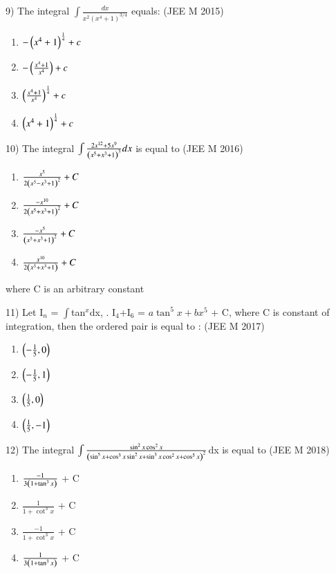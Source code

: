 \documentclass[journal,12pt,twocolumn]{IEEEtran}
\theoremstyle{remark}
\begin{document}
9)
	 The integral $\int\frac{dx}{x^2(x^4+1)^{3/4}}$ equals:
		\hfill{(JEE M 2015)}

		\begin{multicols}{2}
			\begin{enumerate}[label=(\alph*)]
				\item $-\left(x^4+1\right)^{\frac{1}{4}}+c$
				\item $-\left(\frac{x^4+1}{x^4}\right)+c$
				\item $\left(\frac{x^4+1}{x^4}\right)^{\frac{1}{4}}+c$
				\item $\left(x^4+1\right)^{\frac{1}{4}}+c$
			\end{enumerate}
		\end{multicols}

10)
	 The integral $\int\frac{2x^{12}+5x^9}{\left(x^5+x^3+1\right)^3}dx$ is equal to
		\hfill{(JEE M 2016)}

		\begin{multicols}{2}
			\begin{enumerate}[label=(\alph*)]
				\item $\frac{x^5}{2\left(x^5-x^3+1\right)^2}+C$
				\item $\frac{-x^{10}}{2\left(x^5+x^3+1\right)^2}+C$
				\item $\frac{-x^5}{\left(x^5+x^3+1\right)^2}+C$
				\item $\frac{x^{10}}{2\left(x^5+x^3+1\right)}+C$
			\end{enumerate}
		\end{multicols}
		where C is an arbitrary constant

11)
	 Let I$_n$ = $\int$tan$^x$dx, . I$_4$+I$_6$ = $a \tan^5x + bx^5$ + C, where C is constant of integration, then the ordered pair  is equal to :
		\hfill{(JEE M 2017)}

		\begin{multicols}{4}
			\begin{enumerate}[label=(\alph*)]
				\item $\left(-\frac{1}{5}, 0\right)$
				\item $\left(-\frac{1}{5}, 1\right)$
				\item $\left(\frac{1}{5}, 0\right)$
				\item $\left(\frac{1}{5},-1\right)$
			\end{enumerate}
		\end{multicols}
		
12)
	 The integral $\int\frac{\sin^2x\cos^2x}{\left(\sin^5x+\cos^3x\sin^2x+\sin^3x\cos^2x+\cos^5x\right)^2}$dx is equal to
		\hfill{(JEE M 2018)}
		
		\begin{multicols}{2}
			\begin{enumerate}[label=(\alph*)]
				\item $\frac{-1}{3\left(1+\tan ^3x\right)}$ + C
				\item $\frac{1}{1+\cot ^3x}$ + C
				\item $\frac{-1}{1+\cot ^3x}$ + C
				\item $\frac{1}{3\left(1+\tan ^3x\right)}$ + C
			\end{enumerate}
		\end{multicols}
		
\end{document}
